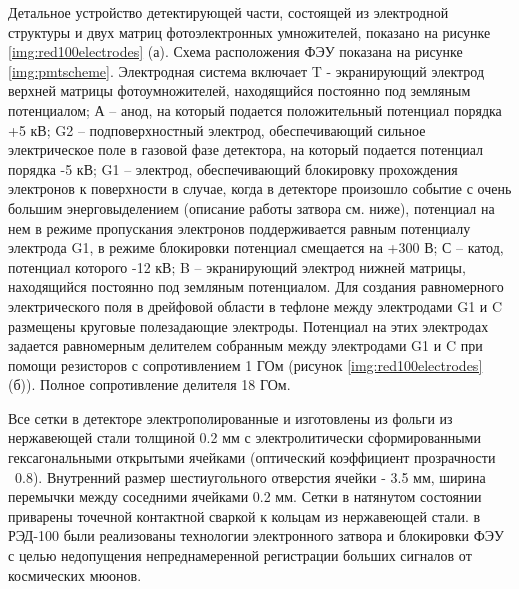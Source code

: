 \par Детальное устройство детектирующей части, состоящей из электродной структуры и двух матриц фотоэлектронных умножителей, показано на рисунке \ref{img:red100electrodes} (а). Схема расположения ФЭУ показана на рисунке \ref{img:pmtscheme}. Электродная система включает T - экранирующий электрод верхней матрицы фотоумножителей, находящийся постоянно под земляным потенциалом; А – анод, на который подается положительный потенциал порядка +5 кВ; G2 – подповерхностный электрод, обеспечивающий сильное электрическое поле в газовой фазе детектора, на который подается потенциал порядка -5 кВ; G1 – электрод, обеспечивающий блокировку прохождения электронов к поверхности в случае, когда в детекторе произошло событие с очень большим энерговыделением (описание работы затвора см. ниже), потенциал на нем в режиме пропускания электронов поддерживается равным потенциалу электрода G1, в режиме блокировки потенциал смещается на +300 В; С – катод, потенциал которого -12 кВ; B – экранирующий электрод нижней матрицы, находящийся постоянно под земляным потенциалом. Для создания равномерного электрического поля в дрейфовой области в тефлоне между электродами G1 и C размещены круговые полезадающие электроды. Потенциал на этих электродах задается равномерным делителем собранным между электродами G1 и C при помощи резисторов с сопротивлением 1 ГОм (рисунок \ref{img:red100electrodes} (б)). Полное сопротивление делителя 18 ГОм.
\par Все сетки в детекторе электрополированные и изготовлены из фольги из нержавеющей стали толщиной 0.2 мм с электролитически сформированными гексагональными открытыми ячейками (оптический коэффициент прозрачности ~0.8). Внутренний размер шестиугольного отверстия ячейки - 3.5 мм, ширина перемычки между соседними ячейками 0.2 мм. Сетки в натянутом состоянии приварены точечной контактной сваркой к кольцам из нержавеющей стали.
 в РЭД-100 были реализованы технологии электронного затвора и блокировки ФЭУ с целью недопущения непреднамеренной регистрации больших сигналов от космических мюонов. 


